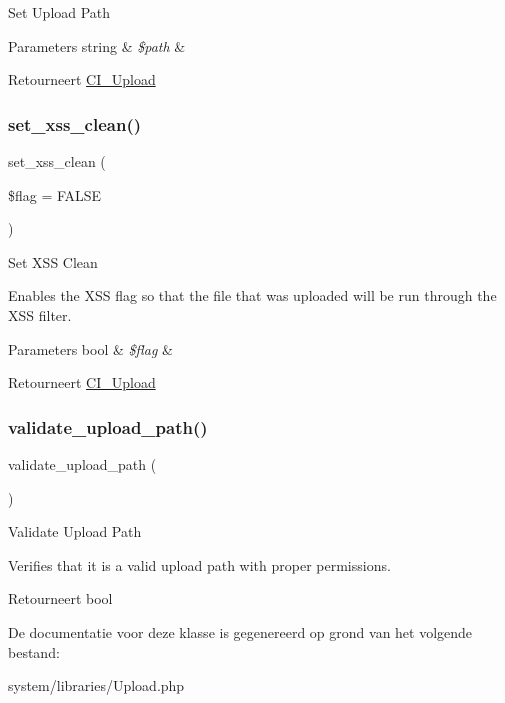 Set Upload Path


\begin{DoxyParams}[1]{Parameters}
string & {\em \$path} & \\
\hline
\end{DoxyParams}
\begin{DoxyReturn}{Retourneert}
\mbox{\hyperlink{class_c_i___upload}{C\+I\+\_\+\+Upload}} 
\end{DoxyReturn}
\mbox{\label{class_c_i___upload_a5556024223414507d84d221862919212}} 
\subsubsection{\texorpdfstring{set\_xss\_clean()}{set\_xss\_clean()}}
{\footnotesize\ttfamily set\+\_\+xss\+\_\+clean (\begin{DoxyParamCaption}\item[{}]{\$flag = {\ttfamily FALSE} }\end{DoxyParamCaption})}

Set X\+SS Clean

Enables the X\+SS flag so that the file that was uploaded will be run through the X\+SS filter.


\begin{DoxyParams}[1]{Parameters}
bool & {\em \$flag} & \\
\hline
\end{DoxyParams}
\begin{DoxyReturn}{Retourneert}
\mbox{\hyperlink{class_c_i___upload}{C\+I\+\_\+\+Upload}} 
\end{DoxyReturn}
\mbox{\label{class_c_i___upload_a067f092935018f0d1fbfa955ddecfee3}} 
\subsubsection{\texorpdfstring{validate\_upload\_path()}{validate\_upload\_path()}}
{\footnotesize\ttfamily validate\+\_\+upload\+\_\+path (\begin{DoxyParamCaption}{ }\end{DoxyParamCaption})}

Validate Upload Path

Verifies that it is a valid upload path with proper permissions.

\begin{DoxyReturn}{Retourneert}
bool 
\end{DoxyReturn}


De documentatie voor deze klasse is gegenereerd op grond van het volgende bestand\+:\begin{DoxyCompactItemize}
\item 
system/libraries/Upload.\+php\end{DoxyCompactItemize}

